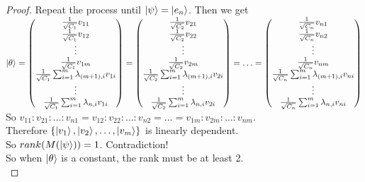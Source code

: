 \begin{proof}
Repeat the process until $\ket{\psi}=\ket{e_n}$. Then we get\\
$\ket{\theta}
=\begin{pmatrix}
\frac{1}{\sqrt{C_1}}v_{11}\\
\frac{1}{\sqrt{C_1}}v_{12}\\
\vdots\\
\frac{1}{\sqrt{C_1}}v_{1m}\\
\frac{1}{\sqrt{C_1}}\sum_{i=1}^m \lambda_{(m+1), i} v_{1i}\\
\vdots\\
\frac{1}{\sqrt{C_1}}\sum_{i=1}^m \lambda_{n, i} v_{1i}
\end{pmatrix}
=\begin{pmatrix}
\frac{1}{\sqrt{C_2}}v_{21}\\
\frac{1}{\sqrt{C_2}}v_{22}\\
\vdots\\
\frac{1}{\sqrt{C_2}}v_{2m}\\
\frac{1}{\sqrt{C_2}}\sum_{i=1}^m \lambda_{(m+1), i} v_{2i}\\
\vdots\\
\frac{1}{\sqrt{C_2}}\sum_{i=1}^m \lambda_{n, i} v_{2i}
\end{pmatrix}
=\hdots
=\begin{pmatrix}
\frac{1}{\sqrt{C_n}}v_{n1}\\
\frac{1}{\sqrt{C_n}}v_{n2}\\
\vdots\\
\frac{1}{\sqrt{C_n}}v_{nm}\\
\frac{1}{\sqrt{C_n}}\sum_{i=1}^m \lambda_{(m+1), i} v_{ni}\\
\vdots\\
\frac{1}{\sqrt{C_n}}\sum_{i=1}^m \lambda_{n, i} v_{ni}
\end{pmatrix}$\\
So $v_{11}:v_{21}:\hdots:v_{n1}=v_{12}:v_{22}:\hdots:v_{n2}=\hdots=v_{1m}:v_{2m}:\hdots:v_{nm}$.\\
Therefore $\{\ket{v_1}, \ket{v_2},\hdots, \ket{v_m}\}$ is linearly dependent.\\
So $rank(M(\ket{\psi})) = 1$. Contradiction!\\
So when $\ket{\theta}$ is a constant, the rank must be at least 2.\\
\end{proof}

